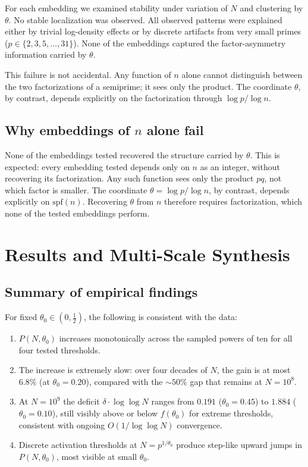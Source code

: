 \documentclass[11pt]{article}
\theoremstyle{definition}
\begin{document}
For each embedding we examined stability under variation of \(N\) and clustering by
\(\theta\).  No stable localization was observed.  All observed patterns were explained
either by trivial log-density effects or by discrete artifacts from very small primes
(\(p \in \{2,3,5,\ldots,31\}\)).  None of the embeddings captured the factor-asymmetry
information carried by \(\theta\).

This failure is not accidental.  Any function of \(n\) alone cannot distinguish
between the two factorizations of a semiprime; it sees only the product.  The
coordinate \(\theta\), by contrast, depends explicitly on the factorization through
\(\log p / \log n\).

\subsection{Why embeddings of \(n\) alone fail}
\label{sec:separation}

None of the embeddings tested recovered the structure carried by
\(\theta\).  This is expected: every embedding tested depends only on
\(n\) as an integer, without recovering its factorization.  Any such
function sees only the product \(pq\), not which factor is smaller.
The coordinate \(\theta = \log p / \log n\), by contrast, depends
explicitly on \(\mathrm{spf}(n)\).  Recovering \(\theta\) from \(n\)
therefore requires factorization, which none of the tested
embeddings perform.


\section{Results and Multi-Scale Synthesis}

\subsection{Summary of empirical findings}

For fixed \(\theta_0 \in (0, \tfrac{1}{2})\), the following is consistent with
the data:
\begin{enumerate}
  \item \(P(N,\theta_0)\) increases monotonically across the sampled powers of ten
        for all four tested thresholds.
  \item The increase is extremely slow: over four decades of \(N\), the gain is at
        most \(6.8\%\) (at \(\theta_0 = 0.20\)), compared with the \(\sim 50\%\) gap
        that remains at \(N = 10^8\).
  \item At \(N = 10^9\) the deficit \(\delta \cdot \log\log N\) ranges from \(0.191\)
        (\(\theta_0=0.45\)) to \(1.884\) (\(\theta_0=0.10\)), still visibly above or
        below \(f(\theta_0)\) for extreme thresholds, consistent with ongoing
        \(O(1/\log\log N)\) convergence.
  \item Discrete activation thresholds at \(N = p^{1/\theta_0}\) produce step-like
        upward jumps in \(P(N,\theta_0)\), most visible at small \(\theta_0\).
\end{enumerate}
\end{document}
